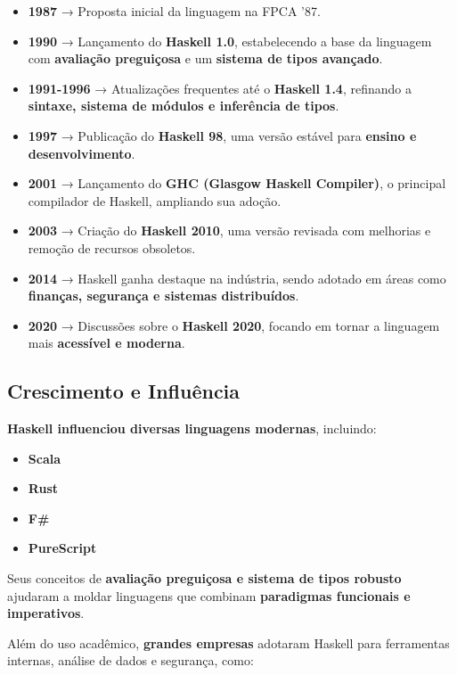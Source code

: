 \begin{itemize}
    \item \textbf{1987} → Proposta inicial da linguagem na FPCA '87.
    \item \textbf{1990} → Lançamento do \textbf{Haskell 1.0}, estabelecendo a base da linguagem com \textbf{avaliação preguiçosa} e um \textbf{sistema de tipos avançado}.
    \item \textbf{1991-1996} → Atualizações frequentes até o \textbf{Haskell 1.4}, refinando a \textbf{sintaxe, sistema de módulos e inferência de tipos}.
    \item \textbf{1997} → Publicação do \textbf{Haskell 98}, uma versão estável para \textbf{ensino e desenvolvimento}.
    \item \textbf{2001} → Lançamento do \textbf{GHC (Glasgow Haskell Compiler)}, o principal compilador de Haskell, ampliando sua adoção.
    \item \textbf{2003} → Criação do \textbf{Haskell 2010}, uma versão revisada com melhorias e remoção de recursos obsoletos.
    \item \textbf{2014} → Haskell ganha destaque na indústria, sendo adotado em áreas como \textbf{finanças, segurança e sistemas distribuídos}.
    \item \textbf{2020} → Discussões sobre o \textbf{Haskell 2020}, focando em tornar a linguagem mais \textbf{acessível e moderna}.
\end{itemize}

\subsection{Crescimento e Influência}

\textbf{Haskell influenciou diversas linguagens modernas}, incluindo:

\begin{itemize}
    \item \textbf{Scala}
    \item \textbf{Rust}
    \item \textbf{F#}
    \item \textbf{PureScript}
\end{itemize}

Seus conceitos de \textbf{avaliação preguiçosa e sistema de tipos robusto} ajudaram a moldar linguagens que combinam \textbf{paradigmas funcionais e imperativos}.

Além do uso acadêmico, \textbf{grandes empresas} adotaram Haskell para ferramentas internas, análise de dados e segurança, como:

